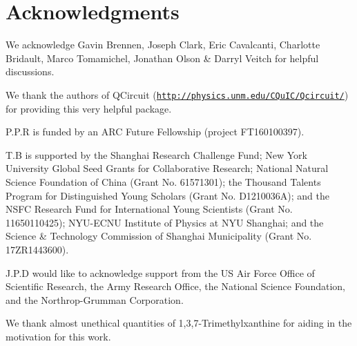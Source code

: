 %
%

\section*{Acknowledgments}

We acknowledge Gavin Brennen, Joseph Clark, Eric Cavalcanti, Charlotte Bridault, Marco Tomamichel, Jonathan Olson \& Darryl Veitch for helpful discussions.

We thank the authors of QCircuit (\texttt{\href{http://physics.unm.edu/CQuIC/Qcircuit/}{http://physics.unm.edu/CQuIC/Qcircuit/}}) for providing this very helpful package.

 P.P.R is funded by an ARC Future Fellowship (project FT160100397).
 
 T.B is supported by the Shanghai Research Challenge Fund; New York University Global Seed Grants for Collaborative Research; National Natural Science Foundation of China (Grant No. 61571301); the Thousand Talents Program for Distinguished Young Scholars (Grant No. D1210036A); and the NSFC Research Fund for International Young Scientists (Grant No. 11650110425); NYU-ECNU Institute of Physics at NYU Shanghai; and the Science \& Technology Commission of Shanghai Municipality (Grant No. 17ZR1443600).
 
 J.P.D would like to acknowledge support from the US Air Force Office of Scientific Research, the Army Research Office, the National Science Foundation, and the Northrop-Grumman Corporation.

We thank almost unethical quantities of 1,3,7-Trimethylxanthine for aiding in the motivation for this work.
